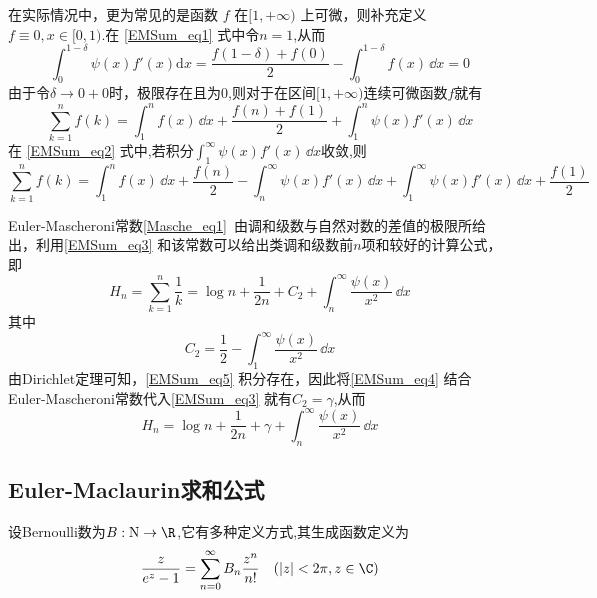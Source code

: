 在实际情况中，更为常见的是函数 $f$ 在$[1,+\infty)$ 上可微，则补充定义$ f\equiv 0,x\in[0,1)$.在 \autoref{EMSum_eq1} 式中令$n=1$,从而
\[
    \int_{0}^{1-\delta}\psi(x)f'(x)\mathrm{d}x
    =\frac{f(1-\delta)+f(0)}{2}-\int_{0}^{1-\delta}f(x)\,\dd x=0
\]
由于令$\delta\to0+0$时，极限存在且为$0$,则对于在区间$[1,+\infty)$连续可微函数$f$就有
\begin{equation}\label{EMSum_eq2}
    \sum_{k=1}^{n}f(k)
    =\int_{1}^{n}f(x)\,\dd x+\frac{f(n)+f(1)}{2}+\int_{1}^{n}\psi(x)f'(x)\,\dd x
\end{equation}
在 \autoref{EMSum_eq2}  式中,若积分$\displaystyle{\int_{1}^{\infty}\psi(x)f'(x)\,\dd x}$收敛,则
\begin{equation}\label{EMSum_eq3}
    \sum_{k=1}^{n}f(k)=\int_{1}^{n}f(x)\,\dd x
    +\frac{f(n)}{2}-\int_{n}^{\infty}\psi(x)f'(x)\,\dd x
    +\int_{1}^{\infty}\psi(x)f'(x)\,\dd x+\frac{f(1)}{2}
\end{equation}
\begin{exercise}{}
Euler-Mascheroni常数\autoref{Masche_eq1}~由调和级数与自然对数的差值的极限所给出，利用\autoref{EMSum_eq3} 和该常数可以给出类调和级数前$n$项和较好的计算公式，即
\begin{equation}\label{EMSum_eq4}
    H_{n}=\sum_{k=1}^{n}\frac{1}{k}=\log n+\frac{1}{2n}+C_{2}
    +\int_{n}^{\infty}\frac{\psi(x)}{x^2}\,\dd x
\end{equation}
其中
\begin{equation}\label{EMSum_eq5}
    C_{2}=\frac{1}{2}-\int_{1}^{\infty}\frac{\psi(x)}{x^2}\,\dd x
\end{equation}
由Dirichlet定理可知，\autoref{EMSum_eq5} 积分存在，因此将\autoref{EMSum_eq4} 结合
Euler-Mascheroni常数代入\autoref{EMSum_eq3} 就有$C_{2}=\gamma$,从而
\begin{equation}
    H_{n}=\log n+\frac{1}{2n}+\gamma+\int_{n}^{\infty}\frac{\psi(x)}{x^2}\,\dd x
\end{equation}
\end{exercise}


\subsection{Euler-Maclaurin求和公式}


    设Bernoulli数为$B:\mathrm{N}\to\R$,它有多种定义方式,其生成函数定义为
    \begin{equation}{}
        \frac{z}{e^{z}-1}=\sum_{n=0}^{\infty}B_{n}\frac{z^{n}}{n!}\quad(|z|<2\pi,z\in{\C})
    \end{equation}
	
